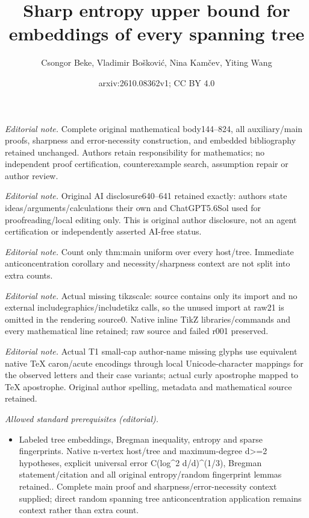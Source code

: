 \documentclass[10pt,a4paper]{amsart}
\title{Sharp entropy upper bound for embeddings of every spanning tree}
\author{Csongor Beke, Vladimir Bošković, Nina Kamčev, Yiting Wang}
\date{arxiv:2610.08362v1; CC BY 4.0}
\numberwithin{equation}{section}
\theoremstyle{definition}
\theoremstyle{remark}
\begin{document}
\maketitle
\noindent\textit{Editorial note.} Complete original mathematical body144--824, all auxiliary/main proofs, sharpness and error-necessity construction, and embedded bibliography retained unchanged. Authors retain responsibility for mathematics; no independent proof certification, counterexample search, assumption repair or author review.\par\medskip
\noindent\textit{Editorial note.} Original AI disclosure640--641 retained exactly: authors state ideas/arguments/calculations their own and ChatGPT5.6Sol used for proofreading/local editing only. This is original author disclosure, not an agent certification or independently asserted AI-free status.\par\medskip
\noindent\textit{Editorial note.} Count only thm:main uniform over every host/tree. Immediate anticoncentration corollary and necessity/sharpness context are not split into extra counts.\par\medskip
\noindent\textit{Editorial note.} Actual missing tikzscale: source contains only its import and no external includegraphics/includetikz calls, so the unused import at raw21 is omitted in the rendering source0. Native inline TikZ libraries/commands and every mathematical line retained; raw source and failed r001 preserved.\par\medskip
\noindent\textit{Editorial note.} Actual T1 small-cap author-name missing glyphs use equivalent native TeX caron/acute encodings through local Unicode-character mappings for the observed letters and their case variants; actual curly apostrophe mapped to TeX apostrophe. Original author spelling, metadata and mathematical source retained.\par\medskip
\noindent\textit{Allowed standard prerequisites (editorial).}\begin{itemize}
\item Labeled tree embeddings, Bregman inequality, entropy and sparse fingerprints. Native n-vertex host/tree and maximum-degree d>=2 hypotheses, explicit universal error C(log\textasciicircum{}2 d/d)\textasciicircum{}(1/3), Bregman statement/citation and all original entropy/random fingerprint lemmas retained.. Complete main proof and sharpness/error-necessity context supplied; direct random spanning tree anticoncentration application remains context rather than extra count.
\end{itemize}\medskip
\end{document}
